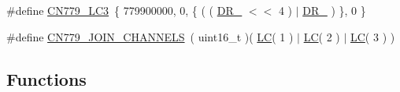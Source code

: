 \begin{DoxyCompactItemize}
\item 
\#define \hyperlink{group__REGIONCN779_ga8e9d424722db59d84a7d122e95f3cce7}{C\+N779\+\_\+\+L\+C3}~\{ 779900000, 0, \{ ( ( \hyperlink{group__REGION_ga872e12c82020c02a7f70a1c6ed1375df}{D\+R\+\_} $<$$<$ 4 ) $\vert$ \hyperlink{group__REGION_ga6c4ef966b4f3d5eb7597b087f2b97095}{D\+R\+\_} ) \}, 0 \}
\item 
\#define \hyperlink{group__REGIONCN779_gaad1a9c76c54bb1be159e6638c1aa768f}{C\+N779\+\_\+\+J\+O\+I\+N\+\_\+\+C\+H\+A\+N\+N\+E\+LS}~( uint16\+\_\+t )( \hyperlink{group__REGION_ga12fa17e5c1016e01a9d82c25027deb1b}{LC}( 1 ) $\vert$ \hyperlink{group__REGION_ga12fa17e5c1016e01a9d82c25027deb1b}{LC}( 2 ) $\vert$ \hyperlink{group__REGION_ga12fa17e5c1016e01a9d82c25027deb1b}{LC}( 3 ) )
\end{DoxyCompactItemize}
\subsection*{Functions}
